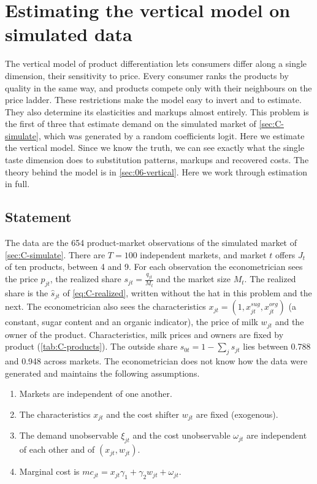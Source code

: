 \section{Estimating the vertical model on simulated data}\label{sec:C-vertical}

The vertical model of product differentiation lets consumers differ along a single dimension, their sensitivity to
price. Every consumer ranks the products by quality in the same way, and products compete only with their neighbours
on the price ladder. These restrictions make the model easy to invert and to estimate. They also determine its
elasticities and markups almost entirely. This problem is the first of three that estimate demand on the simulated
market of \cref{sec:C-simulate}, which was generated by a random coefficients logit. Here we estimate the vertical
model. Since we know the truth, we can see exactly what the single taste
dimension does to substitution patterns, markups and recovered costs. The theory behind the model is in
\cref{sec:06-vertical}. Here we work through estimation in full.

\subsection{Statement}

The data are the 654 product-market observations of the simulated market of \cref{sec:C-simulate}. There are
$T = 100$ independent markets, and market $t$ offers $J_t$ of ten products, between 4 and 9. For each observation the
econometrician sees the price $p_{jt}$, the realized share $s_{jt} = \frac{q_{jt}}{M_t}$ and the market size $M_t$. The realized share is the $\hat s_{jt}$
of \eqref{eq:C-realized}, written without the hat in this problem and the next. The
econometrician also sees the characteristics $x_{jt} = (1, x^{sug}_{jt}, x^{org}_{jt})$ (a constant, sugar content and an organic
indicator), the price of milk $w_{jt}$ and the owner of the product. Characteristics, milk prices and owners are fixed by
product (\cref{tab:C-products}). The outside share $s_{0t} = 1 - \sum_{j} s_{jt}$ lies between 0.788 and 0.948 across
markets. The econometrician does not know how the data were generated and maintains the following assumptions.

\begin{assumption}\label{ass:C-est}
\begin{enumerate}[label=(\roman*)]
  \item Markets are independent of one another.
  \item The characteristics $x_{jt}$ and the cost shifter $w_{jt}$ are fixed (exogenous).
  \item The demand unobservable $\xi_{jt}$ and the cost unobservable $\omega_{jt}$ are independent of each other and of
  $(x_{jt}, w_{jt})$.
  \item Marginal cost is $mc_{jt} = x_{jt}\gamma_1 + \gamma_2 w_{jt} + \omega_{jt}$.
\end{enumerate}
\end{assumption}

